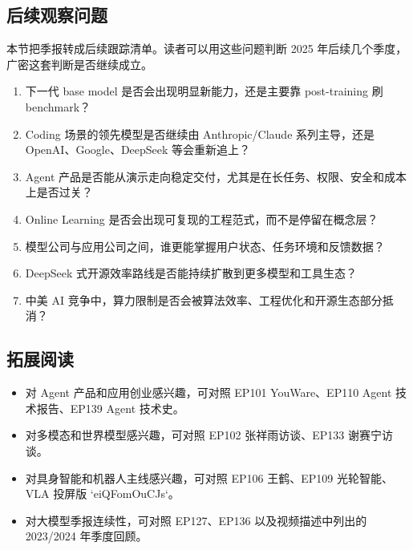 \subsection{后续观察问题}

本节把季报转成后续跟踪清单。读者可以用这些问题判断 2025 年后续几个季度，广密这套判断是否继续成立。

\begin{enumerate}
\item 下一代 base model 是否会出现明显新能力，还是主要靠 post-training 刷 benchmark？
\item Coding 场景的领先模型是否继续由 Anthropic/Claude 系列主导，还是 OpenAI、Google、DeepSeek 等会重新追上？
\item Agent 产品是否能从演示走向稳定交付，尤其是在长任务、权限、安全和成本上是否过关？
\item Online Learning 是否会出现可复现的工程范式，而不是停留在概念层？
\item 模型公司与应用公司之间，谁更能掌握用户状态、任务环境和反馈数据？
\item DeepSeek 式开源效率路线是否能持续扩散到更多模型和工具生态？
\item 中美 AI 竞争中，算力限制是否会被算法效率、工程优化和开源生态部分抵消？
\end{enumerate}

\subsection{拓展阅读}

\begin{itemize}
\item 对 Agent 产品和应用创业感兴趣，可对照 EP101 YouWare、EP110 Agent 技术报告、EP139 Agent 技术史。
\item 对多模态和世界模型感兴趣，可对照 EP102 张祥雨访谈、EP133 谢赛宁访谈。
\item 对具身智能和机器人主线感兴趣，可对照 EP106 王鹤、EP109 光轮智能、VLA 投屏版 `eiQFomOuCJs`。
\item 对大模型季报连续性，可对照 EP127、EP136 以及视频描述中列出的 2023/2024 年季度回顾。
\end{itemize}


